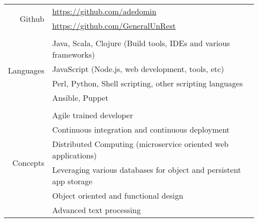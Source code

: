 \documentclass[10pt,letterpaper,]{article}
\begin{document}
\begin{center}
\begin{tabular}{r|l}
    \multirow{2}{*}{Github} & \href{https://github.com/adedomin}{https://github.com/adedomin} \\
                            & \href{https://github.com/GeneralUnRest}{https://github.com/GeneralUnRest} \\
    \\
    \multirow{4}{*}{Languages} & Java, Scala, Clojure (Build tools, IDEs and various frameworks) \\
                               & JavaScript (Node.js, web development, tools, etc) \\
                               & Perl, Python, Shell scripting, other scripting languages \\
                               & Ansible, Puppet \\
    \\
    \multirow{6}{*}{Concepts} & Agile trained developer \\
                              & Continuous integration and continuous deployment \\
                              & Distributed Computing (microservice oriented web applications) \\
                              & Leveraging various databases for object and persistent app storage \\
                              & Object oriented and functional design \\
                              & Advanced text processing \\
\end{tabular}
\end{center}
\end{document}
